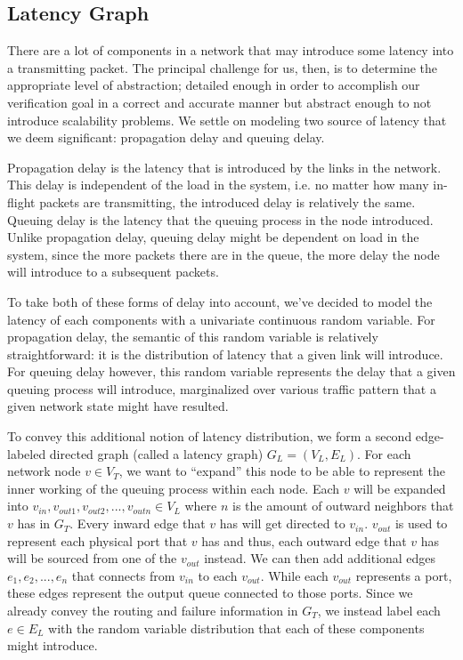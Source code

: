 \documentclass[10pt,sigconf,letterpaper,anonymous,nonacm]{acmart}
\begin{document}
\subsection{Latency Graph}
There are a lot of components in a network that may introduce some latency into 
a transmitting packet. 
The principal challenge for us, then, is to determine the appropriate level of abstraction; 
detailed enough in order to accomplish our verification goal in a correct and accurate manner but 
abstract enough to not introduce scalability problems. 
We settle on modeling two source of latency that we deem significant: propagation delay and 
queuing delay.

Propagation delay is the latency that is introduced by the links in the network. 
This delay is independent of the load in the system, i.e. no matter how many in-flight packets 
are transmitting, the introduced delay is relatively the same. 
Queuing delay is the latency that the queuing process in the node introduced. 
Unlike propagation delay, queuing delay might be dependent on load in the system, since the more 
packets there are in the queue, the more delay the node will introduce to a subsequent packets.

To take both of these forms of delay into account, we've decided to model the latency of each
components with a univariate continuous random variable.
For propagation delay, the semantic of this random variable is relatively straightforward: it is 
the distribution of latency that a given link will introduce.
For queuing delay however, this random variable represents the delay that a given queuing process 
will introduce, marginalized over various traffic pattern that a given network state might have 
resulted.

To convey this additional notion of latency distribution, we form a second edge-labeled directed 
graph (called a latency graph) $G_L = (V_L, E_L)$.
For each network node $v \in V_T$, we want to ``expand'' this node to be able to represent the 
inner working of the queuing process within each node. 
Each $v$ will be expanded into $v_{in}, v_{out1}, v_{out2}, ..., v_{outn} \in V_L$ where $n$ is 
the amount of outward neighbors that $v$ has in $G_T$. 
Every inward edge that $v$ has will get directed to $v_{in}$.
$v_{out}$ is used to represent each physical port that $v$ has and thus, each outward edge that 
$v$ has will be sourced from one of the $v_{out}$ instead.
We can then add additional edges $e_1, e_2, ..., e_n$ that connects from $v_{in}$ to each 
$v_{out}$.
While each $v_{out}$ represents a port, these edges represent the output queue connected to those 
ports.
Since we already convey the routing and failure information in $G_T$, we instead label each 
$e \in E_L$ with the random variable distribution that each of these components might introduce.
\end{document}
